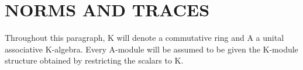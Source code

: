 \section{NORMS AND TRACES}

Throughout this paragraph, K will denote a commutative ring and A a unital associative K-algebra. Every A-module will be assumed to be given the K-module structure obtained by restricting the scalars to K.
\relax{}
